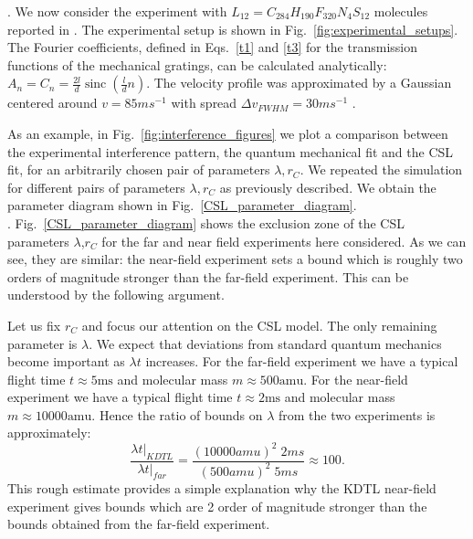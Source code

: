 \documentclass[12pt,groupedaddress,pra,aps]{revtex4-1}
\DeclareMathOperator\sinc{sinc}
\begin{document}
.
We now consider the experiment with $L_{12}= C_{284}H_{190}F_{320}N_4S_{12}$ molecules reported in \cite{C3CP51500A}. The experimental setup is shown in Fig.~\ref{fig:experimental_setups}. The Fourier coefficients, defined in Eqs.~\eqref{t1} and \eqref{t3} for the transmission functions of the mechanical gratings, can be calculated analytically: $A_n=C_n=\frac{2l}{d}\sinc(\frac{l}{d}n)$. The velocity profile was approximated by a Gaussian centered around $v=85ms^{-1}$ with spread $\Delta v_{FWHM}=30ms^{-1}$ \cite{C3CP51500A}.

As an example, in Fig.~\ref{fig:interference_figures} we plot a comparison between the experimental interference pattern, the quantum mechanical fit and the CSL fit, for an arbitrarily chosen pair of parameters $\lambda, r_C$. We repeated the simulation for different pairs of parameters $\lambda, r_C$ as previously described. We obtain the parameter diagram shown in Fig.~\ref{CSL_parameter_diagram}.\\

.
Fig.~\ref{CSL_parameter_diagram} shows the exclusion zone of the CSL parameters $\lambda$,$r_C$ for the far and near field experiments here considered. As we can see, they are similar: the near-field experiment sets a bound which is roughly two orders of magnitude stronger than the far-field experiment. This can be understood by the following argument.

Let us fix $r_C$ and focus our attention on the CSL model. The only remaining parameter is $\lambda$. We expect that deviations from standard quantum mechanics become important as $\lambda t$ increases. For the far-field experiment we have a typical flight time $t \approx 5 \text{ms} $ and molecular mass $m \approx 500 \text{amu}$. For the near-field experiment we have a typical flight time $t \approx 2 \text{ms} $  and  molecular mass $m \approx 10000 \text{amu}$.
Hence the ratio of bounds on $\lambda$ from the two experiments is approximately:
\begin{equation}
\frac{\lambda t |_{KDTL}}{\lambda t |_{far}}=\frac{(10000amu)^2 \;2ms}{ (500amu)^2 \;5ms} \approx 100.
\end{equation}
This rough estimate provides a simple explanation why the KDTL near-field experiment gives bounds which are 2 order of magnitude stronger than the bounds obtained from the far-field experiment.\\
\end{document}
